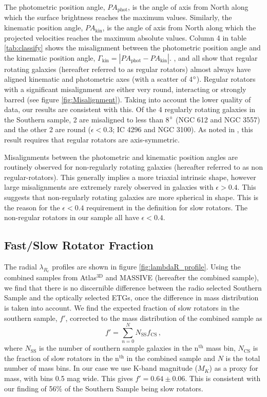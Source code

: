 		The photometric position angle, $PA_\text{phot}$, is the angle of axis from North along which the surface brightness reaches the maximum values. Similarly, the kinematic position angle, $PA_\text{kin}$, is the angle of axis from North along which the projected velocities reaches the maximum absolute values. Column 4 in table \ref{tab:classify} shows the misalignment between the photometric position angle and the kinematic position angle, $\Gamma_\text{kin} = \left| PA_\text{phot} - PA_\text{kin} \right|$. \citet{Cappellari2007}, \citet{Krajnovic2011} and \citet{Fogarty2015} all show that regular rotating galaxies (hereafter referred to as regular rotators) almost always have aligned kinematic and photometric axes (with a scatter of 4$\degree$). 
		Regular rotators with a significant misalignment are either very round, interacting or strongly barred (see figure \ref{fig:Misalignment}). Taking into account the lower quality of data, our results are consistent with this. Of the 4 regularly rotating galaxies in the Southern sample, 2 are misaligned to less than 8$\degree$ (NGC 612 and NGC 3557) and the other 2 are round ($\epsilon < 0.3$; IC 4296 and NGC 3100). As noted in \citet{Cappellari2016}, this result requires that regular rotators are axis-symmetric.

		Misalignments between the photometric and kinematic position angles are routinely observed for non-regularly rotating galaxies (hereafter referred to as non regular-rotators). This generally implies a more triaxial intrinsic shape, however large misalignments are extremely rarely observed in galaxies with $\epsilon > 0.4$. This suggests that non-regularly rotating galaxies are more spherical in shape. This is the reason for the $\epsilon < 0.4$ requirement in the definition for slow rotators. The non-regular rotators in our sample all have $\epsilon < 0.4$. 


	\subsection{Fast/Slow Rotator Fraction}
		\label{subsec:FSfrac}
		The radial $\lambda_{R_e}$ profiles are shown in figure \ref{fig:lambdaR_profile}. Using the combined samples from Atlas$^\text{3D}$ and MASSIVE (hereafter the combined sample), we find that there is no discernible difference between the radio selected Southern Sample and the optically selected ETGs, once the difference in mass distribution is taken into account. 
		We find the expected fraction of slow rotators in the southern sample, $f'$, corrected to the mass distribution of the combined sample as
		\begin{equation}
			f' = \sum_{n=0}^N N_\mathrm{SS} f_\mathrm{CS}\, , 
		\end{equation}
		where $N_\mathrm{SS}$ is the number of southern sample galaxies in the n$^\mathrm{th}$ mass bin, $N_\mathrm{CS}$ is the fraction of slow rotators in the n$^\mathrm{th}$ in the combined sample and $N$ is the total number of mass bins. In our case we use K-band magnitude ($M_K$) as a proxy for mass, with bins 0.5 mag wide. This gives $f' = 0.64 \pm 0.06$. This is consistent with our finding of 56\% of the Southern Sample being slow rotators.

